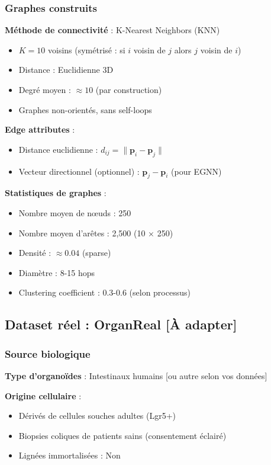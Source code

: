 \subsubsection{Graphes construits}

\textbf{Méthode de connectivité} : K-Nearest Neighbors (KNN)
\begin{itemize}
    \item $K = 10$ voisins (symétrisé : si $i$ voisin de $j$ alors $j$ voisin de $i$)
    \item Distance : Euclidienne 3D
    \item Degré moyen : $\approx 10$ (par construction)
    \item Graphes non-orientés, sans self-loops
\end{itemize}

\textbf{Edge attributes} :
\begin{itemize}
    \item Distance euclidienne : $d_{ij} = \|\mathbf{p}_i - \mathbf{p}_j\|$
    \item Vecteur directionnel (optionnel) : $\mathbf{p}_j - \mathbf{p}_i$ (pour EGNN)
\end{itemize}

\textbf{Statistiques de graphes} :
\begin{itemize}
    \item Nombre moyen de nœuds : 250
    \item Nombre moyen d'arêtes : 2,500 (10 × 250)
    \item Densité : $\approx 0.04$ (sparse)
    \item Diamètre : 8-15 hops
    \item Clustering coefficient : 0.3-0.6 (selon processus)
\end{itemize}

\subsection{Dataset réel : OrganReal [À adapter]}

\subsubsection{Source biologique}

\textbf{Type d'organoïdes} : Intestinaux humains [ou autre selon vos données]

\textbf{Origine cellulaire} :
\begin{itemize}
    \item Dérivés de cellules souches adultes (Lgr5+)
    \item Biopsies coliques de patients sains (consentement éclairé)
    \item Lignées immortalisées : Non
\end{itemize}


